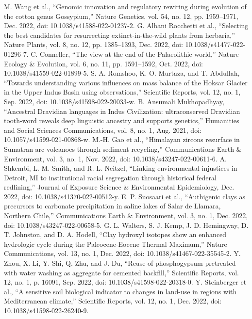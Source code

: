 \documentclass[conference]{IEEEtran}
\begin{document}
\begin{thebibliography}{00}
 M. Wang et al., “Genomic innovation and regulatory rewiring during evolution of the cotton genus Gossypium,” Nature Genetics, vol. 54, no. 12, pp. 1959–1971, Dec. 2022, doi: 10.1038/s41588-022-01237-2.
 G. Albani Rocchetti et al., “Selecting the best candidates for resurrecting extinct-in-the-wild plants from herbaria,” Nature Plants, vol. 8, no. 12, pp. 1385–1393, Dec. 2022, doi: 10.1038/s41477-022-01296-7.
 C. Conneller, “The view at the end of the Palaeolithic world,” Nature Ecology \& Evolution, vol. 6, no. 11, pp. 1591–1592, Oct. 2022, doi: 10.1038/s41559-022-01899-5.
 S. A. Romshoo, K. O. Murtaza, and T. Abdullah, “Towards understanding various influences on mass balance of the Hoksar Glacier in the Upper Indus Basin using observations,” Scientific Reports, vol. 12, no. 1, Sep. 2022, doi: 10.1038/s41598-022-20033-w.
 B. Ansumali Mukhopadhyay, “Ancestral Dravidian languages in Indus Civilization: ultraconserved Dravidian tooth-word reveals deep linguistic ancestry and supports genetics,” Humanities and Social Sciences Communications, vol. 8, no. 1, Aug. 2021, doi: 10.1057/s41599-021-00868-w.
 M.-H. Gao et al., “Himalayan zircons resurface in Sumatran arc volcanoes through sediment recycling,” Communications Earth \& Environment, vol. 3, no. 1, Nov. 2022, doi: 10.1038/s43247-022-00611-6.
 A. Shkembi, L. M. Smith, and R. L. Neitzel, “Linking environmental injustices in Detroit, MI to institutional racial segregation through historical federal redlining,” Journal of Exposure Science \& Environmental Epidemiology, Dec. 2022, doi: 10.1038/s41370-022-00512-y.
 E. P. Suosaari et al., “Authigenic clays as precursors to carbonate precipitation in saline lakes of Salar de Llamara, Northern Chile,” Communications Earth \& Environment, vol. 3, no. 1, Dec. 2022, doi: 10.1038/s43247-022-00658-5.
 G. L. Walters, S. J. Kemp, J. D. Hemingway, D. T. Johnston, and D. A. Hodell, “Clay hydroxyl isotopes show an enhanced hydrologic cycle during the Paleocene-Eocene Thermal Maximum,” Nature Communications, vol. 13, no. 1, Dec. 2022, doi: 10.1038/s41467-022-35545-2.
 Y. Zhou, X. Li, Y. Shi, Q. Zhu, and J. Du, “Reuse of phosphogypsum pretreated with water washing as aggregate for cemented backfill,” Scientific Reports, vol. 12, no. 1, p. 16091, Sep. 2022, doi: 10.1038/s41598-022-20318-0.
 Y. Steinberger et al., “A sensitive soil biological indicator to changes in land-use in regions with Mediterranean climate,” Scientific Reports, vol. 12, no. 1, Dec. 2022, doi: 10.1038/s41598-022-26240-9.

\end{thebibliography}
\end{document}
